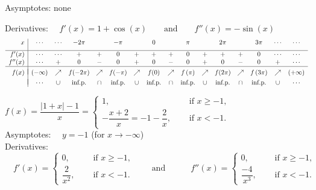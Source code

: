 \begin{Answer}
    
        \Question Asymptotes: \quad none\par
                Derivatives: $\quad f'(x)=1+\cos (x) \qquad\mbox{and}\qquad f''(x)=-\sin (x)$
                \[ \begin{array}{r|ccccccccccccccc}
                x & \cdots & \cdots & -2\pi & & -\pi &  & 0 & & \pi & & 2\pi & & 3\pi &  \cdots & \cdots \\[0.2cm]
                \hline
                f'(x) & \cdots & \cdots & + & +& 0 & + & + & + & 0 & + & + & + & 0 &  \cdots &  \cdots \\
                f''(x) &\cdots & + & 0 & - & 0 & + & 0 & - & 0 & + & 0 & - & 0 &+ &\cdots\\
                \hline
                &&&&&\vspace{-0.3cm}\\
                f(x) & (-\infty) & \nearrow   & f(-2\pi) & \nearrow & f(-\pi) & \nearrow & f(0) & \nearrow & f\left(\pi\right) & \nearrow & f(2\pi) & \nearrow & f\left(3\pi\right)& \nearrow   & (+\infty)  \\
                &&&&&\vspace{-0.3cm}\\                                                                      
                   & \cdots & \cup  & \mbox{inf.p.}  & \cap & \mbox{inf.p.} & \cup & \mbox{inf.p.} & \cap & \mbox{inf.p.}  & \cup & \mbox{inf.p.}  &\cap& \mbox{inf.p.}  & \cup & \cdots  \\
                \end{array}\]
                
        \Question $f(x) = \dfrac{|1+x|-1}{x} = \left\{ \begin{array}{ll} 1, & \quad \text{ if } x \geq -1, \\
    		-\dfrac{x+2}{x} = -1 -\dfrac{2}{x}, & \quad \text{ if } x < -1. \end{array} \right.$ \\[0.2cm]
    		    Asymptotes: $\quad y=-1$ \quad (for $x\rightarrow -\infty$) \\[0.2cm]
    		    Derivatives: $\quad f'(x) = \left\{ \begin{array}{ll} 0, & \quad \text{ if } x \geq -1, \\
    		\dfrac{2}{x^2}, & \quad \text{ if } x < -1. \end{array} \right. \qquad\mbox{and}\qquad \quad f''(x) = \left\{ \begin{array}{ll} 0, & \quad \text{ if } x \geq -1, \\
    		\dfrac{-4}{x^3}, & \quad \text{ if } x < -1. \end{array} \right.$ \\
    		

\end{Answer}
